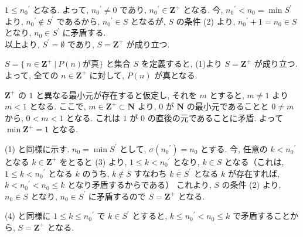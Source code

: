 \begin{nmprob}
{$1 \leq {n_0}^{'}$ となる. よって, ${n_0}^{'} \neq 0$ であり, ${n_0}^{'} \in \bm{Z}^+$ となる.
今, ${n_0}^{'} < n_0 = \min S^{'}$ より, ${n_0}^{'} \notin S^{'}$ であるから, ${n_0}^{'} \in S$ となるが, $S$ の条件 (2) より, ${n_0}^{'} + 1 = n_0 \in S$ となり, $n_0 \in S^{'}$ に矛盾する.\\
以上より, $S^{'} = \emptyset$ であり, $S = \bm{Z}^+$ が成り立つ.
\item $S =  \{\ n \in \bm{Z}^+\ |\ P(n) \text{が真} \}$ と集合 $S$ を定義すると, (1)より $S = \bm{Z}^+$ が成り立つ.
よって, 全ての $n \in \bm{Z}^+$ に対して, $P(n)$ が真となる.
\item $\bm{Z}^+$ の $1$ と異なる最小元が存在すると仮定し, それを $m$ とすると, $m \neq 1$ より $m < 1$ となる.
ここで, $m \in \bm{Z}^{+} \subset \bm{N}$ より, $0$ が $\bm{N}$ の最小元であることと $0 \neq m$ から, $0 < m < 1$ となる. これは $1$ が $0$ の直後の元であることに矛盾. よって $\min \bm{Z}^+ = 1$ となる.
\item (1) と同様に示す. $n_0 = \min S^{'}$ として, $\sigma ({n_0}^{'}) = n_0$ とする.
今, 任意の $k < {n_0}^{'}$ となる $k \in \bm{Z}^+$ をとると (3) より, $1 \leq k < {n_0}^{'}$ となり, $k \in S$ となる（これは, $1 \leq k < {n_0}^{'}$ となる $k$ のうち, $k \notin S$ すなわち $k \in S^{'}$ となる $k$ が存在すれば, $k < {n_0}^{'} < n_0 \leq k$ となり矛盾するからである）
これより, $S$ の条件 (2) より, $n_0 \in S$ となり, $n_0 \in S^{'}$ に矛盾するので $S = \bm{Z}^+$ となる.
\item (4) と同様に $1 \leq k \leq {n_0}^{'}$ で $k \in S^{'}$ とすると, $k \leq {n_0}^{'} < n_0 \leq k$ で矛盾することから, $S = \bm{Z}^+$ となる.
} 
\end{nmprob}



